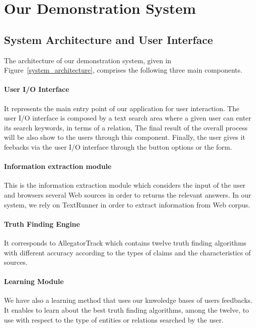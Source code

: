 \section{Our Demonstration System}

\subsection{System Architecture and User Interface}
The architecture of our demonstration system, given in
Figure~\ref{system_architecture}, comprises the following
three main components.

\paragraph*{User I/O Interface}It represents the main entry point
of our application for user interaction. The user I/O interface is
composed by a text search area where a given user can enter its 
search keywords, in terms of a relation, The final result of the 
overall process will be also show to the users through this component.
Finally, the user gives it feebacks via the user I/O interface through
the button options or the form.

\paragraph*{Information extraction module} This is the information 
extraction module which considers the input of the user and browsers
several Web sources in order to returns the relevant answers. In our 
system, we rely on TextRunner in order to extract information from Web corpus.

\paragraph*{Truth Finding Engine} It corresponds to AllegatorTrack which contains
twelve truth finding algorithms with different accuracy according to the types of 
claims and the characteristics of sources.

\paragraph*{Learning Module} We have also a learning method that uses our knwoledge
bases of users feedbacks. It enables to learn about the best truth finding algorithms,
among the twelve, to use with respect to the type of entities or relations searched by 
the user.

